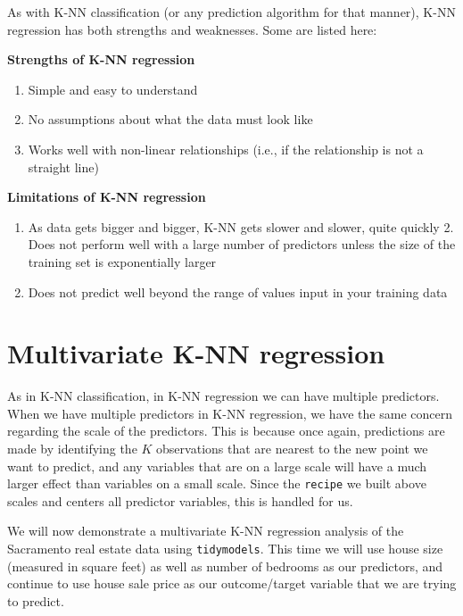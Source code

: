 \documentclass[
]{krantz}
\providecommand{\tightlist}{%
  \setlength{\itemsep}{0pt}\setlength{\parskip}{0pt}}
\begin{document}
As with K-NN classification (or any prediction algorithm for that manner), K-NN regression has both strengths and weaknesses. Some are listed here:

\textbf{Strengths of K-NN regression}

\begin{enumerate}
\def\labelenumi{\arabic{enumi}.}
\tightlist
\item
  Simple and easy to understand
\item
  No assumptions about what the data must look like
\item
  Works well with non-linear relationships (i.e., if the relationship is not a straight line)
\end{enumerate}

\textbf{Limitations of K-NN regression}

\begin{enumerate}
\def\labelenumi{\arabic{enumi}.}
\tightlist
\item
  As data gets bigger and bigger, K-NN gets slower and slower, quite quickly 2. Does not perform well with a large number of predictors unless the size of the training set is exponentially larger
\item
  Does not predict well beyond the range of values input in your training data
\end{enumerate}

\hypertarget{multivariate-k-nn-regression}{%
\section{Multivariate K-NN regression}\label{multivariate-k-nn-regression}}

As in K-NN classification, in K-NN regression we can have multiple predictors.
When we have multiple predictors in K-NN regression, we have the same concern
regarding the scale of the predictors. This is because once again,
predictions are made by identifying the \(K\)
observations that are nearest to the new point we want to predict, and any
variables that are on a large scale will have a much larger effect than
variables on a small scale. Since the \texttt{recipe} we built above scales and centers
all predictor variables, this is handled for us.

We will now demonstrate a multivariate K-NN regression analysis of the
Sacramento real estate data using \texttt{tidymodels}. This time we will use
house size (measured in square feet) as well as number of bedrooms as our
predictors, and continue to use house sale price as our outcome/target variable
that we are trying to predict.
\end{document}
